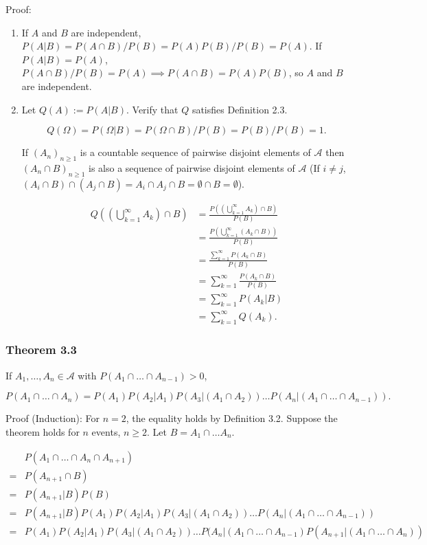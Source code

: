\documentclass{article}
\begin{document}
Proof: 

\begin{enumerate}
\item If $A$ and $B$ are independent, $P(A \vert B) = P(A\cap B) / P(B) = P(A)P(B) / P(B) = P(A)$. If $P(A \vert B) = P(A)$, $P(A\cap B) / P(B) = P(A) \implies P(A\cap B) = P(A) P(B)$, so $A$ and $B$ are independent. 

\item Let $Q(A) := P(A \vert B)$. Verify that $Q$ satisfies Definition 2.3. 

$$
Q(\Omega) = P(\Omega \vert B) = P(\Omega \cap B) / P(B) = P(B) / P(B) = 1.
$$

If $(A_n)_{n\geq 1}$ is a countable sequence of pairwise disjoint elements of $\mathcal{A}$ then $(A_n \cap B)_{n\geq 1}$ is also a sequence of pairwise disjoint elements of $\mathcal{A}$ (If $i \neq j$, $(A_i \cap B) \cap (A_j \cap B) = A_i \cap A_j \cap B = \emptyset \cap B = \emptyset$). 

\begin{align*}
Q\left(\left(\bigcup_{k=1}^\infty A_k \right) \cap B \right) &= \frac{P\left(\left(\bigcup_{k=1}^\infty A_k \right)\cap B \right)}{P(B)} \\
&= \frac{P\left(\bigcup_{k=1}^\infty (A_k\cap B) \right)}{P(B)} \\
&= \frac{\sum_{k=1}^\infty P(A_k \cap B)}{P(B)} \\
&= \sum_{k=1}^\infty \frac{P(A_k \cap B)}{P(B)} \\
&= \sum_{k=1}^\infty P(A_k \vert B) \\
&= \sum_{k=1}^\infty Q(A_k) .
\end{align*}
\end{enumerate}

\subsubsection*{Theorem 3.3} If $A_1, \dots , A_n \in \mathcal{A}$ with $P(A_1 \cap \dots \cap A_{n-1}) > 0$,

$$P(A_1 \cap \dots \cap A_n) = P(A_1)P(A_2 \vert A_1)P(A_3 \vert (A_1 \cap A_2)) \dots P(A_n \vert (A_1 \cap \dots \cap A_{n-1})).
$$

Proof (Induction): For $n = 2$, the equality holds by Definition 3.2. Suppose the theorem holds for $n$ events, $n \geq 2$. Let $B = A_1 \cap \dots A_n$.

\begin{align*}
&P(A_1 \cap \dots \cap A_n \cap A_{n+1}) \\
= &P(A_{n+1} \cap B) \\
= &P(A_{n+1} \vert B)P(B)\\
= &P(A_{n+1} \vert B)P(A_1)P(A_2 \vert A_1)P(A_3 \vert (A_1 \cap A_2)) \dots P(A_n \vert (A_1 \cap \dots \cap A_{n-1})) \\
= & P(A_1)P(A_2 \vert A_1)P(A_3 \vert (A_1 \cap A_2)) \dots P(A_{n} \vert (A_1 \cap \dots \cap A_{n-1}) P(A_{n+1} \vert (A_1 \cap \dots \cap A_{n})) \\
\end{align*}
\end{document}
